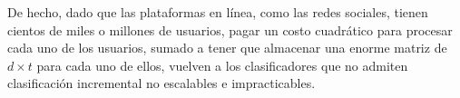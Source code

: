 De hecho, dado que las plataformas en línea, como las redes sociales, tienen cientos de miles o millones de usuarios, pagar un costo cuadrático para procesar cada uno de los usuarios, sumado a tener que almacenar una enorme matriz de $d\times t$ para cada uno de ellos, vuelven a los clasificadores que no admiten clasificación incremental no escalables e impracticables.


